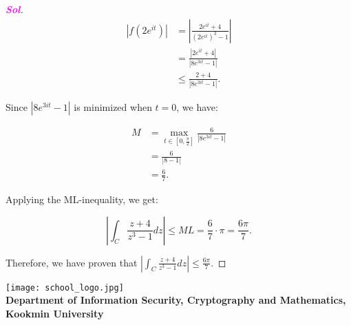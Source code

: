 \documentclass{article}
\newcommand{\footer}[1]{
	\begin{flushright}
		\vspace{2em}
		\texttt{[image: school\_logo.jpg]} \\
		\vspace{1em}
		\textcolor{blue2}{\small\textbf{#1}}
	\end{flushright}
}
\theoremstyle{definition}
\newcommand{\sol}{\textcolor{magenta}{\bf Sol}}
\begin{document}
\begin{enumerate}
\begin{proof}[\sol]
			\begin{align*}
			\left|f(2e^{it})\right| &= \left|\frac{2e^{it} + 4}{(2e^{it})^3 - 1}\right| \\
			&= \frac{|2e^{it} + 4|}{|8e^{3it} - 1|} \\
			&\leq \frac{2 + 4}{|8e^{3it} - 1|}.
			\end{align*}
			
			Since $|8e^{3it} - 1|$ is minimized when $t = 0$, we have:
			
			\begin{align*}
			M &= \max_{t \in [0, \frac{\pi}{2}]} \frac{6}{|8e^{3it} - 1|} \\
			&= \frac{6}{|8 - 1|} \\
			&= \frac{6}{7}.
			\end{align*}
			
			Applying the ML-inequality, we get:
			
			\[
			\left|\int_C \frac{z + 4}{z^3 - 1} dz\right| \leq ML = \frac{6}{7} \cdot \pi = \frac{6\pi}{7}.
			\]
			
			Therefore, we have proven that $\left|\int_C \frac{z + 4}{z^3 - 1} dz\right| \leq \frac{6\pi}{7}$.
			
		\end{proof}
	\end{enumerate}
	
	\footer{Department of Information Security, Cryptography and Mathematics, Kookmin University}
\end{document}
